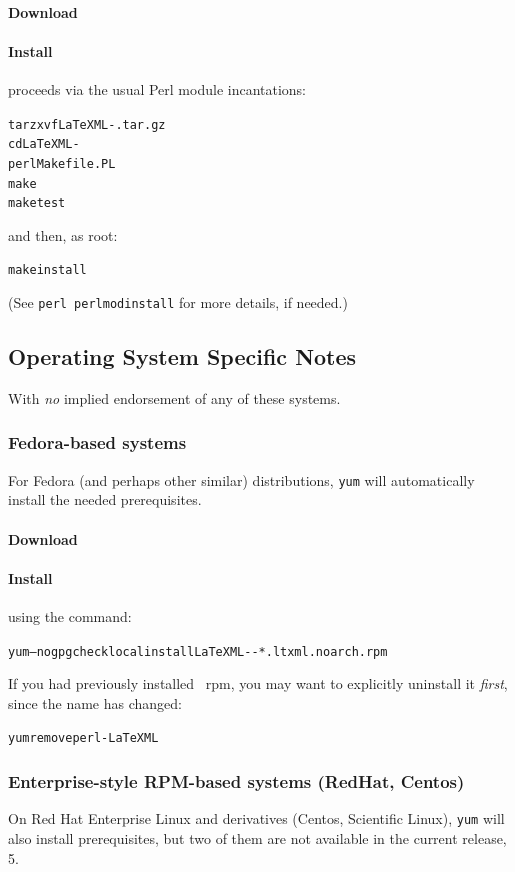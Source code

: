 \documentclass{article}
\begin{document}
\paragraph{Download} \CurrentTarball
\paragraph{Install} proceeds via the usual Perl module incantations:
\begin{alltt}
   tar zxvf LaTeXML-\CurrentVersion.tar.gz\\
   cd LaTeXML-\CurrentVersion\\
   perl Makefile.PL
   make
   make test
\end{alltt}
and then, as root:
\begin{alltt}
   make install
\end{alltt}
(See \texttt{perl perlmodinstall} for more details, if needed.)


\subsection[OS-Specific Notes]{Operating System Specific Notes}\label{install.osnotes}
With \emph{no} implied endorsement of any of these systems.

\subsubsection[Fedora-based systems]{Fedora-based systems}\label{install.fedora}
For Fedora (and perhaps other similar) distributions, \texttt{yum} will automatically install
the needed prerequisites.
\paragraph{Download} \CurrentFedora
\paragraph{Install} using the command:
\begin{alltt}
   yum --nogpgcheck localinstall LaTeXML-\CurrentVersion-*.ltxml.noarch.rpm
\end{alltt}
If you had previously installed \LaTeXML\ rpm, you may want to explicitly
uninstall it \emph{first}, since the name has changed:
\begin{alltt}
   yum remove perl-LaTeXML
\end{alltt}

\subsubsection[Enterprise systems]{Enterprise-style RPM-based systems (RedHat, Centos)}\label{install.enterprise}
On Red Hat Enterprise Linux and derivatives (Centos, Scientific Linux), \texttt{yum} will also
install prerequisites, but two of them are not available in the current release, 5.
\end{document}
